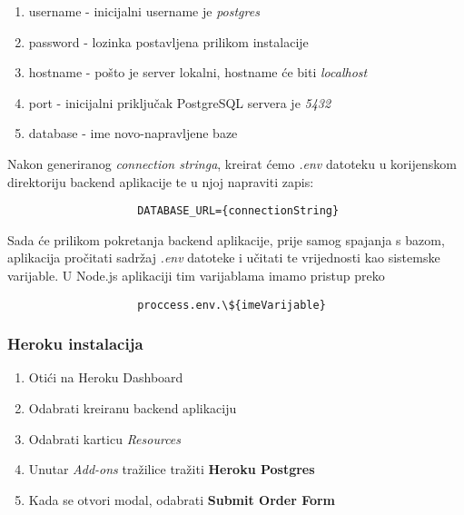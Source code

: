 		        \begin{enumerate}
		            \item username - inicijalni username je \textit{postgres}
		            \item password - lozinka postavljena prilikom instalacije
		            \item hostname - pošto je server lokalni, hostname će biti \textit{localhost}
		            \item port - inicijalni priključak PostgreSQL servera je \textit{5432}
		            \item database - ime novo-napravljene baze
		        \end{enumerate}
		        
		        Nakon generiranog \textit{connection stringa}, kreirat ćemo \textit{.env} datoteku u korijenskom direktoriju backend aplikacije te u njoj napraviti zapis:
		        
		        \begin{verbatim}
		            DATABASE_URL={connectionString}
		        \end{verbatim}
		        
		        Sada će prilikom pokretanja backend aplikacije, prije samog spajanja s bazom, aplikacija pročitati sadržaj \textit{.env} datoteke i učitati te vrijednosti kao sistemske varijable. U Node.js aplikaciji tim varijablama imamo pristup preko
		        
		        \begin{verbatim}
		            proccess.env.\${imeVarijable}
		        \end{verbatim}
		
		    \subsubsection*{Heroku instalacija}
		    
		         \begin{enumerate}
		            \item Otići na Heroku Dashboard
		            \item Odabrati kreiranu backend aplikaciju
		            \item Odabrati karticu \textit{Resources}
		            \item Unutar \textit{Add-ons} tražilice tražiti \textbf{Heroku Postgres}
		            \item Kada se otvori modal, odabrati \textbf{Submit Order Form}
		        \end{enumerate}
		        
